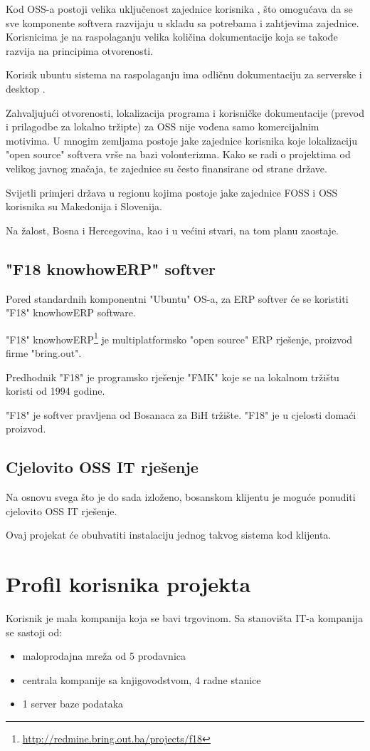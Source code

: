 \documentclass[times, utf8, seminar]{fit}
\begin{document}
Kod OSS-a postoji velika uključenost zajednice korisnika , što omogućava da se sve komponente softvera razvijaju u skladu sa potrebama i zahtjevima zajednice. Korisnicima je na raspolaganju velika količina dokumentacije koja se takođe razvija na principima otvorenosti.

Korisik ubuntu sistema na raspolaganju ima odličnu dokumentaciju za serverske \cite{ubuntudesktop} i desktop \cite{ubuntuserver}.

Zahvaljujući otvorenosti, lokalizacija programa i korisničke dokumentacije (prevod i prilagodbe za lokalno tržipte) za OSS nije vođena samo komercijalnim motivima. U mnogim zemljama postoje jake zajednice korisnika koje lokalizaciju "open source" softvera vrše na bazi volonterizma. Kako se radi o projektima od velikog javnog značaja, te zajednice su često finansirane od strane države.

Svijetli primjeri država u regionu kojima postoje jake zajednice FOSS  i OSS  korisnika su Makedonija i Slovenija.

Na žalost, Bosna i Hercegovina, kao i u većini stvari, na tom planu zaostaje. 

\subsection{"F18 knowhowERP" softver}
Pored standardnih komponentni "Ubuntu" OS-a, za ERP softver će se koristiti "F18" knowhowERP software.

"F18" knowhowERP\footnote{\url{http://redmine.bring.out.ba/projects/f18}} je multiplatformsko "open source" ERP rješenje, proizvod firme "bring.out".  

Predhodnik "F18" je programsko rješenje "FMK" koje se na lokalnom tržištu koristi od 1994 godine.

"F18" je softver pravljena od Bosanaca za BiH tržište. "F18" je u cjelosti domaći proizvod.

\subsection{Cjelovito OSS IT rješenje}
Na osnovu svega što je do sada izloženo, bosanskom klijentu je moguće ponuditi cjelovito OSS IT rješenje.  

Ovaj projekat će obuhvatiti instalaciju jednog takvog sistema kod klijenta.

\section{Profil korisnika projekta}
Korisnik je mala kompanija koja se bavi trgovinom. Sa stanovišta IT-a kompanija se sastoji od:
\begin{itemize}
  \item maloprodajna mreža od 5 prodavnica
  \item centrala kompanije sa knjigovodstvom, 4 radne stanice
  \item 1 server baze podataka 
\end{itemize}
\end{document}

